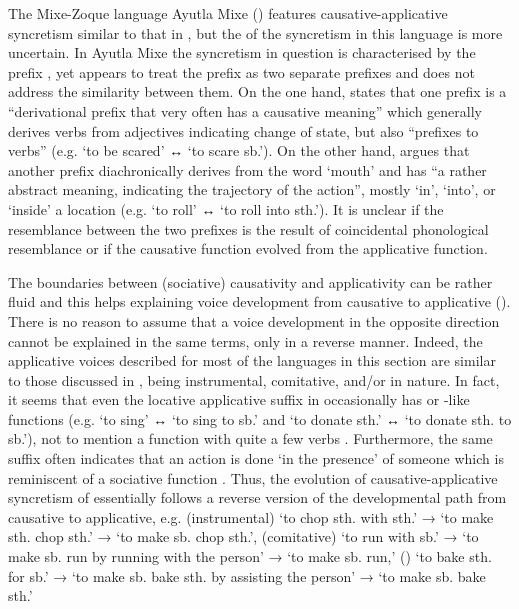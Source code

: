 The Mixe-Zoque language Ayutla Mixe () features causative-applicative syncretism similar to that in , but the  of the syncretism in this language is more uncertain. In Ayutla Mixe the syncretism in question is characterised by the prefix , yet \cite{romero-mendez:2009} appears to treat the prefix as two separate prefixes and does not address the similarity between them. On the one hand, \cite[97, 401f.]{romero-mendez:2009} states that one prefix  is a “derivational prefix that very often has a causative meaning” which generally derives verbs from adjectives indicating change of state, but also “prefixes to verbs” (e.g.  ‘to be scared’ ↔  ‘to scare sb.’). On the other hand, \cite[381ff., 602]{romero-mendez:2009} argues that another prefix  diachronically derives from the word  ‘mouth’ and has “a rather abstract meaning, indicating the trajectory of the action”, mostly ‘in’, ‘into’, or ‘inside’ a location (e.g.  ‘to roll’ ↔  ‘to roll into sth.’). It is unclear if the resemblance between the two prefixes  is the result of coincidental phonological resemblance or if the causative function evolved from the applicative function.

The boundaries between (sociative) causativity and applicativity can be rather fluid and this helps explaining voice development from causative to applicative (). There is no reason to assume that a voice development in the opposite direction cannot be explained in the same terms, only in a reverse manner. Indeed, the applicative voices described for most of the languages in this section are similar to those discussed in , being instrumental, comitative, and/or  in nature. In fact, it seems that even the locative applicative suffix  in  occasionally has  or -like functions (e.g.  ‘to sing’ ↔  ‘to sing to sb.’ and  ‘to donate sth.’ ↔  ‘to donate sth. to sb.’), not to mention a  function with quite a few verbs \citep[131ff.]{kanu:2012}. Furthermore, the same suffix often indicates that an action is done ‘in the presence’ of someone which is reminiscent of a sociative function \citep[130]{kanu:2012}. Thus, the evolution of causative-applicative syncretism of  essentially follows a reverse version of the developmental path from causative to applicative, e.g. (instrumental) ‘to chop sth. with sth.’ → ‘to make sth. chop sth.’ → ‘to make sb. chop sth.’, (comitative) ‘to run with sb.’ → ‘to make sb. run by running with the person’ → ‘to make sb. run,’ () ‘to bake sth. for sb.’ → ‘to make sb. bake sth. by assisting the person’ → ‘to make sb. bake sth.’

